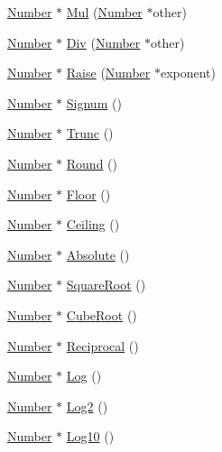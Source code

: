 \begin{DoxyCompactItemize}
\item 
\hyperlink{structNumber}{Number} $\ast$ \hyperlink{structComplexNumber_a8b876b0e7e776fa2f0fa2bc034cc224b}{Mul} (\hyperlink{structNumber}{Number} $\ast$other)
\item 
\hyperlink{structNumber}{Number} $\ast$ \hyperlink{structComplexNumber_a78f07b5e0e9d481629e3814b6037522b}{Div} (\hyperlink{structNumber}{Number} $\ast$other)
\item 
\hyperlink{structNumber}{Number} $\ast$ \hyperlink{structComplexNumber_a0ab40e1cbe5c25629fe62643ed8b9352}{Raise} (\hyperlink{structNumber}{Number} $\ast$exponent)
\item 
\hyperlink{structNumber}{Number} $\ast$ \hyperlink{structComplexNumber_a0dc0f3ef7885f9d6b5a30e6ce983ceeb}{Signum} ()
\item 
\hyperlink{structNumber}{Number} $\ast$ \hyperlink{structComplexNumber_aab24afa1330c3777b0e29c6d85114bf1}{Trunc} ()
\item 
\hyperlink{structNumber}{Number} $\ast$ \hyperlink{structComplexNumber_a5026a3ed13a525843d02acbd0d94a4aa}{Round} ()
\item 
\hyperlink{structNumber}{Number} $\ast$ \hyperlink{structComplexNumber_abf02b60fa622fae2724b7a6768acf2d6}{Floor} ()
\item 
\hyperlink{structNumber}{Number} $\ast$ \hyperlink{structComplexNumber_a4788f638a16773706510bdc2edd0ea49}{Ceiling} ()
\item 
\hyperlink{structNumber}{Number} $\ast$ \hyperlink{structComplexNumber_a7fb865f9bca992bb78dc057f3d8cfd82}{Absolute} ()
\item 
\hyperlink{structNumber}{Number} $\ast$ \hyperlink{structComplexNumber_a9c2d08c5faba8c3db38186264f2361a9}{Square\+Root} ()
\item 
\hyperlink{structNumber}{Number} $\ast$ \hyperlink{structComplexNumber_a1589eac796ec230625298d196fe84c25}{Cube\+Root} ()
\item 
\hyperlink{structNumber}{Number} $\ast$ \hyperlink{structComplexNumber_ac85979812dffce5a38ccf3cab090b320}{Reciprocal} ()
\item 
\hyperlink{structNumber}{Number} $\ast$ \hyperlink{structComplexNumber_af2b337a76672ec647dbe707d3287d6df}{Log} ()
\item 
\hyperlink{structNumber}{Number} $\ast$ \hyperlink{structComplexNumber_ae8ff446ea20c3b1e4dfa979eaed9ea86}{Log2} ()
\item 
\hyperlink{structNumber}{Number} $\ast$ \hyperlink{structComplexNumber_a77a7c95712136b6beeded79210a18c00}{Log10} ()
\item 

\end{DoxyCompactItemize}
